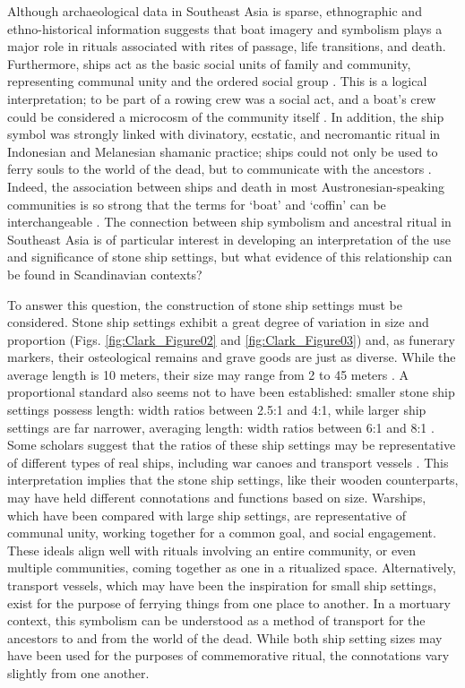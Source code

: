 Although archaeological data in Southeast Asia is sparse, ethnographic and ethno-historical information suggests that boat imagery and symbolism plays a major role in rituals associated with rites of passage, life transitions, and death. Furthermore, ships act as the basic social units of family and community, representing communal unity and the ordered social group \parencite[392]{Ballard_2004}.
This is a logical interpretation; to be part of a rowing crew was a social act, and a boat’s crew could be considered a microcosm of the community itself \parencite[46]{Westerdahl_2015}.
In addition, the ship symbol was strongly linked with divinatory, ecstatic, and necromantic ritual in Indonesian and Melanesian shamanic practice; ships could not only be used to ferry souls to the world of the dead, but to communicate with the ancestors \parencite[392]{Ballard_2004}.
Indeed, the association between ships and death in most Austronesian-speaking communities is so strong that the terms for ‘boat’ and ‘coffin’ can be interchangeable \parencites[392]{Ballard_2004}[196]{Manguin_1986}. The connection between ship symbolism and ancestral ritual in Southeast Asia is of particular interest in developing an interpretation of the use and significance of stone ship settings, but what evidence of this relationship can be found in Scandinavian contexts?

To answer this question, the construction of stone ship settings must be considered. Stone ship settings exhibit a great degree of variation in size and proportion (Figs. \ref{fig:Clark_Figure02} and \ref{fig:Clark_Figure03}) and, as funerary markers, their osteological remains and grave goods are just as diverse.
While the average length is 10 meters, their size may range from 2 to 45 meters \parencite[222]{Price_2015}.
A proportional standard also seems not to have been established: smaller stone ship settings possess length: width ratios between 2.5:1 and 4:1, while larger ship settings are far narrower, averaging length: width ratios between 6:1 and 8:1 \parencite[95]{Bradley_2010}.
Some scholars suggest that the ratios of these ship settings may be representative of different types of real ships, including war canoes and transport vessels \parencites{Artursson_2013}{Bradley_2010}[204-205]{Skoglund_2014}. This interpretation implies that the stone ship settings, like their wooden counterparts, may have held different connotations and functions based on size. Warships, which have been compared with large ship settings, are representative of communal unity, working together for a common goal, and social engagement. These ideals align well with rituals involving an entire community, or even multiple communities, coming together as one in a ritualized space. Alternatively, transport vessels, which may have been the inspiration for small ship settings, exist for the purpose of ferrying things from one place to another. In a mortuary context, this symbolism can be understood as a method of transport for the ancestors to and from the world of the dead. While both ship setting sizes may have been used for the purposes of commemorative ritual, the connotations vary slightly from one another.

